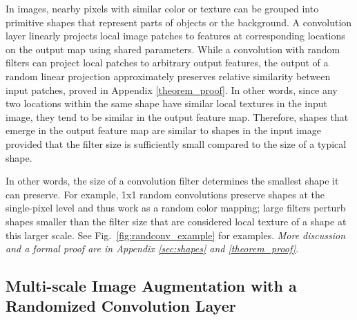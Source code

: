 \documentclass{article} \usepackage{iclr2021_conference,times}
\begin{document}
 In images, nearby pixels with similar color or texture can be grouped into primitive shapes that represent parts of objects or the background. A convolution layer linearly projects local image patches to features at corresponding locations on the output map using shared parameters. While a convolution with random filters can project local patches to arbitrary output features, the output of a random linear projection approximately preserves relative similarity between input patches, proved in Appendix \ref{theorem_proof}. In other words, since any two locations within the same shape have similar local textures in the input image, they tend to be similar in the output feature map. Therefore, shapes that emerge in the output feature map are similar to shapes in the input image provided that the filter size is sufficiently small compared to the size of a typical shape.

In other words, the size of a convolution filter determines the smallest shape it can preserve. For example, 1x1 random convolutions preserve shapes at the single-pixel level and thus work as a random color mapping; large filters perturb shapes smaller than the filter size that are considered local texture of a shape at this larger scale. See Fig.~\ref{fig:randconv_example} for examples. \textit{More discussion and a formal proof are in Appendix \ref{sec:shapes} and \ref{theorem_proof}}. 

\subsection{Multi-scale Image Augmentation with a Randomized Convolution Layer}
\label{sec:randconv}
\end{document}
